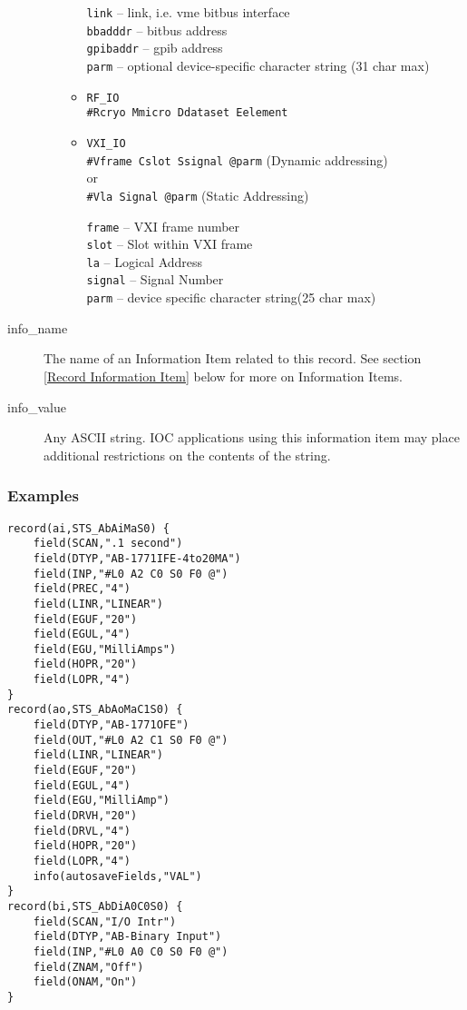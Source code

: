 \begin{description}
\begin{itemize}
\begin{itemize}
\verb|link| -- link, i.e. vme bitbus interface \\
\verb|bbadddr| -- bitbus address \\
\verb|gpibaddr| -- gpib address \\
\verb|parm| -- optional device-specific character string (31 char max)

\item \verb|RF_IO| \\
\verb|#Rcryo Mmicro Ddataset Eelement|

\item \verb|VXI_IO| \\
\verb|#Vframe Cslot Ssignal @parm| (Dynamic addressing) \\
     or \\
\verb|#Vla Signal @parm|  (Static Addressing)

\verb|frame| -- VXI frame number \\
\verb|slot| -- Slot within VXI frame \\
\verb|la| -- Logical Address \\
\verb|signal| -- Signal Number \\
\verb|parm| -- device specific character string(25 char max)
\end{itemize}
\end{itemize}

\item [info\_name] The name of an Information Item related to this record.
See section \ref{Record Information Item} below for more on Information Items.

\item [info\_value] Any ASCII string.
IOC applications using this information item may place additional restrictions on the contents of the string.

\end{description}

\subsubsection{Examples}

\begin{verbatim}
record(ai,STS_AbAiMaS0) {
    field(SCAN,".1 second")
    field(DTYP,"AB-1771IFE-4to20MA")
    field(INP,"#L0 A2 C0 S0 F0 @")
    field(PREC,"4")
    field(LINR,"LINEAR")
    field(EGUF,"20")
    field(EGUL,"4")
    field(EGU,"MilliAmps")
    field(HOPR,"20")
    field(LOPR,"4")
}
record(ao,STS_AbAoMaC1S0) {
    field(DTYP,"AB-1771OFE")
    field(OUT,"#L0 A2 C1 S0 F0 @")
    field(LINR,"LINEAR")
    field(EGUF,"20")
    field(EGUL,"4")
    field(EGU,"MilliAmp")
    field(DRVH,"20")
    field(DRVL,"4")
    field(HOPR,"20")
    field(LOPR,"4")
    info(autosaveFields,"VAL")
}
record(bi,STS_AbDiA0C0S0) {
    field(SCAN,"I/O Intr")
    field(DTYP,"AB-Binary Input")
    field(INP,"#L0 A0 C0 S0 F0 @")
    field(ZNAM,"Off")
    field(ONAM,"On")
}
\end{verbatim}

